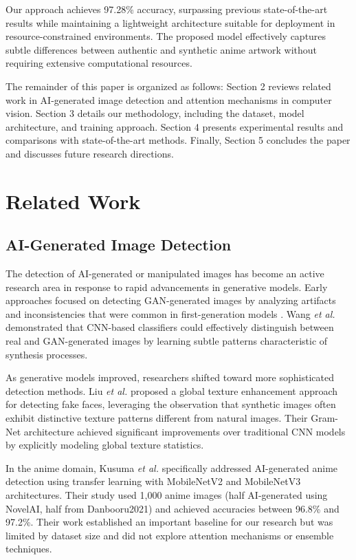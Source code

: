 \documentclass{article}
\begin{document}
Our approach achieves 97.28\% accuracy, surpassing previous state-of-the-art results while maintaining a lightweight architecture suitable for deployment in resource-constrained environments. The proposed model effectively captures subtle differences between authentic and synthetic anime artwork without requiring extensive computational resources.

The remainder of this paper is organized as follows: Section 2 reviews related work in AI-generated image detection and attention mechanisms in computer vision. Section 3 details our methodology, including the dataset, model architecture, and training approach. Section 4 presents experimental results and comparisons with state-of-the-art methods. Finally, Section 5 concludes the paper and discusses future research directions.

\section{Related Work}

\subsection{AI-Generated Image Detection}

The detection of AI-generated or manipulated images has become an active research area in response to rapid advancements in generative models. Early approaches focused on detecting GAN-generated images by analyzing artifacts and inconsistencies that were common in first-generation models \cite{marra2018detection}. Wang \textit{et al.} \cite{wang2020cnn} demonstrated that CNN-based classifiers could effectively distinguish between real and GAN-generated images by learning subtle patterns characteristic of synthesis processes.

As generative models improved, researchers shifted toward more sophisticated detection methods. Liu \textit{et al.} \cite{liu2020global} proposed a global texture enhancement approach for detecting fake faces, leveraging the observation that synthetic images often exhibit distinctive texture patterns different from natural images. Their Gram-Net architecture achieved significant improvements over traditional CNN models by explicitly modeling global texture statistics.

In the anime domain, Kusuma \textit{et al.} \cite{kusuma2024detection} specifically addressed AI-generated anime detection using transfer learning with MobileNetV2 and MobileNetV3 architectures. Their study used 1,000 anime images (half AI-generated using NovelAI, half from Danbooru2021) and achieved accuracies between 96.8\% and 97.2\%. Their work established an important baseline for our research but was limited by dataset size and did not explore attention mechanisms or ensemble techniques.
\end{document}
